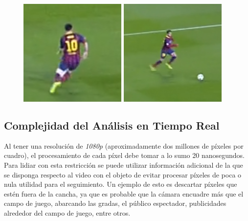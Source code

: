 \begin{figure}[H]
    \begin{minipage}[t]{.5\textwidth}
        \centering
        \includegraphics[width=.4\linewidth]{./images/resize_barcelona2.png}
    \end{minipage}%
    \begin{minipage}[t]{.5\textwidth}
        \centering
        \includegraphics[width=.4\linewidth]{./images/resize_barcelona3.png}
    \end{minipage}
\end{figure}

\subsection{Complejidad del Análisis en Tiempo Real}

Al tener una resolución de \textit{1080p} (aproximadamente dos millones de
píxeles por cuadro), el procesamiento de cada píxel debe tomar a lo sumo 20
nanosegundos.  Para lidiar con esta restricción se puede utilizar información
adicional de la que se disponga respecto al video con el objeto de evitar
procesar píxeles de poca o nula utilidad para el seguimiento. Un ejemplo de
esto es descartar píxeles que estén fuera de la cancha, ya que es probable que
la cámara encuadre más que el campo de juego, abarcando las gradas, el público
espectador, publicidades alrededor del campo de juego, entre otros.


